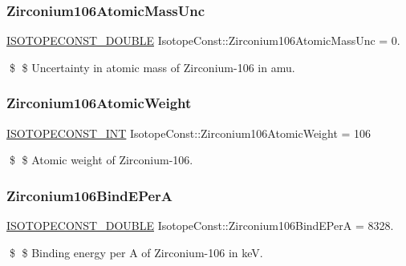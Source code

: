\subsubsection{\texorpdfstring{Zirconium106\+Atomic\+Mass\+Unc}{Zirconium106AtomicMassUnc}}
{\footnotesize\ttfamily \mbox{\hyperlink{group___isotope_const-_macros_ga8f45a7272ce02c0b4c65c44636ed719a}{I\+S\+O\+T\+O\+P\+E\+C\+O\+N\+S\+T\+\_\+\+D\+O\+U\+B\+LE}} Isotope\+Const\+::\+Zirconium106\+Atomic\+Mass\+Unc = 0.}

\$ \$ Uncertainty in atomic mass of Zirconium-\/106 in amu. \mbox{\label{group___isotope_const-_zirconium-_zr106_ga896618867ae855098f49774577083b8f}} 
\subsubsection{\texorpdfstring{Zirconium106\+Atomic\+Weight}{Zirconium106AtomicWeight}}
{\footnotesize\ttfamily \mbox{\hyperlink{group___isotope_const-_macros_ga5f18360b3e99483a35c32d789e62621c}{I\+S\+O\+T\+O\+P\+E\+C\+O\+N\+S\+T\+\_\+\+I\+NT}} Isotope\+Const\+::\+Zirconium106\+Atomic\+Weight = 106}

\$ \$ Atomic weight of Zirconium-\/106. \mbox{\label{group___isotope_const-_zirconium-_zr106_ga067b136803f190480b3704082d4622de}} 
\subsubsection{\texorpdfstring{Zirconium106\+Bind\+E\+PerA}{Zirconium106BindEPerA}}
{\footnotesize\ttfamily \mbox{\hyperlink{group___isotope_const-_macros_ga8f45a7272ce02c0b4c65c44636ed719a}{I\+S\+O\+T\+O\+P\+E\+C\+O\+N\+S\+T\+\_\+\+D\+O\+U\+B\+LE}} Isotope\+Const\+::\+Zirconium106\+Bind\+E\+PerA = 8328.}

\$ \$ Binding energy per A of Zirconium-\/106 in keV. \mbox{\label{group___isotope_const-_zirconium-_zr106_ga2837e2c43b98b725b18164315531b083}} 
